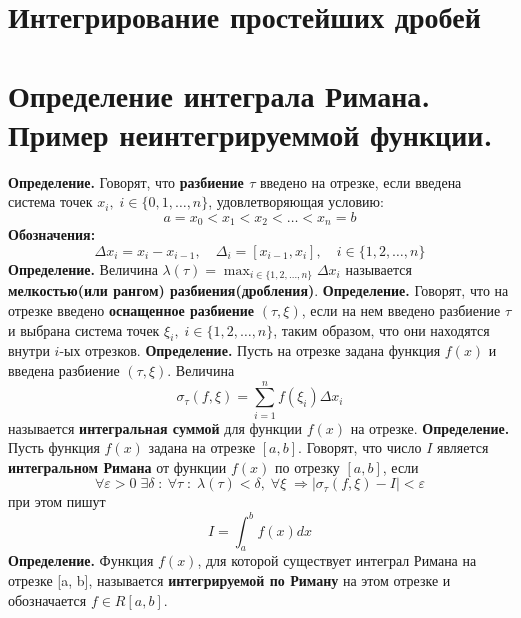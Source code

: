 \documentclass{article}
\newcommand*{\definition}[1]{\textbf{Определение.} #1 \newline}
\begin{document}
\section{Интегрирование простейших дробей}
\section{Определение интеграла Римана. Пример неинтегрируеммой функции.}
\definition{ Говорят, что \textbf{разбиение $\tau$} введено на отрезке, если введена система точек $x_i, \; i \in \{0, 1, \dots, n\}$, удовлетворяющая условию: }
$$
    a = x_0 < x_1 < x_2 < \dots < x_n = b
$$
\textbf{Обозначения: }
$$
    \Delta x_i = x_i - x_{i-1}, \quad \Delta_i = [x_{i-1}, x_i], \quad i \in \{1, 2, \dots, n \}
$$
\definition{Величина $\lambda(\tau) = \displaystyle \max_{i \in \{1, 2, \dots, n \}} \Delta x_i$ называется \textbf{мелкостью(или рангом) разбиения(дробления)}.}
\newline
\definition{Говорят, что на отрезке введено \textbf{оснащенное разбиение} $(\tau, \xi)$, если на нем введено разбиение $\tau$ и выбрана система точек $\xi_i, \; i \in \{ 1, 2, \dots, n\}$, таким образом, что они находятся внутри $i$-ых отрезков.}
\newline
\definition{Пусть на отрезке задана функция $f(x)$ и введена разбиение $(\tau, \xi)$. Величина}
$$
    \sigma_\tau(f, \xi) = \sum_{i = 1}^{n} f(\xi_i) \Delta x_i
$$
называется \textbf{интегральная суммой} для функции $f(x)$ на отрезке.
\newline 
\newline 
\definition{Пусть функция $f(x)$ задана на отрезке $[a, b]$. Говорят, что число $I$ является \textbf{интегральном Римана} от функции $f(x)$ по отрезку $[a, b]$, если}
$$
    \forall \varepsilon > 0 \; \exists \delta \; : \: \forall \tau \; : \; \lambda(\tau) < \delta, \; \forall \xi \; \Rightarrow |\sigma_\tau(f, \xi) - I| < \varepsilon
$$
при этом пишут 
$$
    I = \int_{a}^{b} f(x)dx
$$
\definition{Функция $f(x)$, для которой существует интеграл Римана на отрезке [a, b], называется \textbf{интегрируемой по Риману} на этом отрезке и обозначается $f \in R[a, b]$.}
\newline 
\end{document}
